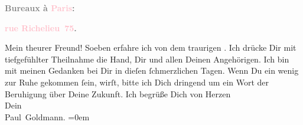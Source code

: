            \pstart
           \begin{otherlanguage}{french}\textcolor{gray}{\textbf{\textbf{Bureaux à \textcolor{pink}{Paris}{}\ledrightnote{\textcolor{pink}{Paris}}:}}}\end{otherlanguage}\pend
           \pstart
           \begin{otherlanguage}{french}\textcolor{gray}{\textbf{\textbf{\textcolor{pink}{rue Richelieu 75}{}\ledrightnote{\textcolor{pink}{rue Richelieu}}.}}}\end{otherlanguage}\pend
           \pstart
           Mein theurer Freund!\pend
           \pstart
           Soeben erfahre ich von dem traurigen \label{K_L02706-v}\label{K_L02706-h}. Ich drücke Dir mit tiefgefühlter Theilnahme die Hand, Dir
               und allen Deinen Angehörigen. Ich bin mit meinen Gedanken bei Dir in dieſen
               ſchmerzlichen Tagen. Wenn Du ein wenig zur Ruhe gekommen ſein, wirſt, bitte ich Dich
               dringend um ein Wort der Beruhigung über Deine Zukunft.\pend
           \pstart
           Ich begrüße Dich von Herzen {\\[\baselineskip]}Dein {\\[\baselineskip]}\spacefill\mbox{Paul Goldmann.}\pend
           \leftskip=0em{}\endnumbering{}\begin{anhang}\end{anhang}
      